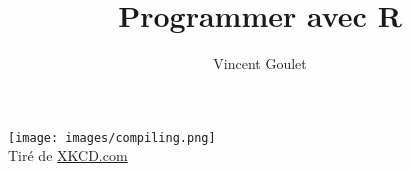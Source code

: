 \documentclass[letterpaper,11pt,x11names,english,french]{memoir}
\title{Programmer avec R}
\author{Vincent Goulet}
\theoremstyle{remark}
\begin{document}
\frontmatter

\pagestyle{empty}


\null\cleardoublepage           %


\clearpage

\pagestyle{companion}

%
\tableofcontents*

\cleartoverso
\thispagestyle{empty}
\begin{vplace}[0.45]
  \centering
  \begin{minipage}{0.9\linewidth}
    \texttt{[image: images/compiling.png]} \\
    \footnotesize\sffamily%
    Tiré de \href{http://xkcd.com/303/}{XKCD.com}
  \end{minipage}
\end{vplace}

\mainmatter











%

\appendix







\cleardoublepage
\printindex

\pagestyle{empty}

\cleartoverso


\cleartoverso

\end{document}
